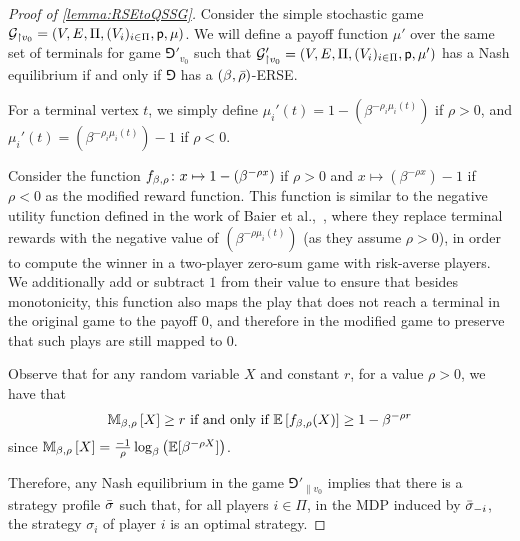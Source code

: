 \RSEtoQSSG*
\begin{proof}[Proof of \cref{lemma:RSEtoQSSG}]
    Consider the simple stochastic game $\mathcal{G}_{\upharpoonright v_0} = \left( V,E,\Pi,(V_i)_{i\in \Pi},\mathsf{p} ,\mu \right)$. We will define a payoff  function $\mu'$ over the same set of terminals for game $\Game'_{v_0}$ such that $\mathcal{G}'_{\upharpoonright v_0} = \left( V,E,\Pi,(V_i)_{i\in \Pi},\mathsf{p} ,\mu' \right)$ has a Nash equilibrium if and only if $\Game$ has a $(\beta,{\bar{\rho}})$-ERSE.

    For a terminal vertex $t$, we simply define $\mu_i'(t) = 1-(\beta^{-\rho_i\mu_i(t)})$ if $\rho>0$, and $\mu_i'(t) = (\beta^{-\rho_i\mu_i(t)})-1$ if $\rho<0$.
    
    Consider the function $f_{\beta,\rho}\colon x\mapsto 1-(\beta^{-\rho x})$ if 
    $\rho>0$ and $x\mapsto (\beta^{-\rho x})-1$ if $\rho<0$
    as the modified reward function.  This function is similar to the negative utility function defined in the work of Baier et al.,~\cite{BCMP24}, where they replace terminal rewards with the negative value of $(\beta^{-\rho\mu_i(t)})$ (as they assume $\rho>0$), in order to compute the winner in a two-player zero-sum game with risk-averse players. We additionally add or subtract $1$ from their value  to ensure that besides monotonicity, this function also maps the play that does not reach a terminal in the original game to the payoff $0$, and therefore in the modified game to preserve that such plays are still mapped to $0$. 
    
    Observe that for any random variable $X$ and constant $r$, for a value $\rho>0$, we have that 
    \begin{equation}\label{inequality:REvsExp}    
    \mathbb{M}_{\beta,\rho}\left[X\right] \geq r\text{ if and only if }\mathbb{E}\left[f_{\beta,\rho}(X)\right] \geq 1-\beta^{-\rho r}\end{equation}
    since $\mathbb{M}_{\beta,\rho}\left[X\right] = \frac{-1}{\rho}\log_\beta\left( \mathbb{E}[\beta^{-\rho X}] \right)$.
    
    Therefore, any Nash equilibrium in the game $\Game'_{\|v_0}$ implies that there is a strategy profile ${\bar{\sigma}}$ such that, for all players $i\in\Pi$, in the MDP induced by ${\bar{\sigma}}_{-i}$, the strategy $\sigma_i$ of player $i$ is an optimal strategy. 


\end{proof}
